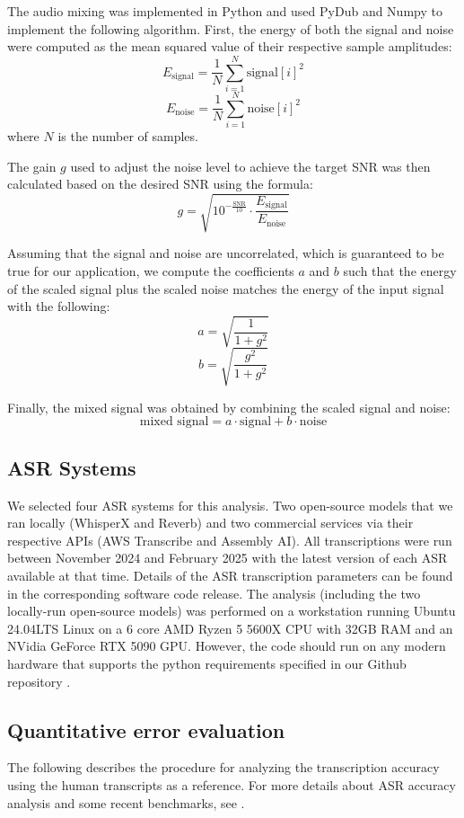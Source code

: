 \documentclass{article}
\begin{document}
The audio mixing was implemented in Python and used PyDub \cite{pydub2018} and Numpy \cite{numpyharris2020} to implement the following algorithm. First, the energy of both the signal and noise were computed as the mean squared value of their respective sample amplitudes:
   \[
   E_{\text{signal}} = \frac{1}{N} \sum_{i=1}^{N} \text{signal}[i]^2
   \]
   \[
   E_{\text{noise}} = \frac{1}{N} \sum_{i=1}^{N} \text{noise}[i]^2
   \]
   where \( N \) is the number of samples.

The gain \( g \) used to adjust the noise level to achieve the target SNR was then calculated based on the desired SNR using the formula:
   \[
   g = \sqrt{10^{-\frac{\text{SNR}}{10}} \cdot \frac{E_{\text{signal}}}{E_{\text{noise}}}}
   \]

Assuming that the signal and noise are uncorrelated, which is guaranteed to be true for our application, we compute the coefficients \( a \) and \( b \) such that the energy of the scaled signal plus the scaled noise matches the energy of the input signal with the following:
   \[
   a = \sqrt{\frac{1}{1 + g^2}}
   \]
   \[
   b = \sqrt{\frac{g^2}{1 + g^2}}
   \]

Finally, the mixed signal was obtained by combining the scaled signal and noise:
   \[
   \text{mixed signal} = a \cdot \text{signal} + b \cdot \text{noise}
   \]


\subsection{ASR Systems}
We selected four ASR systems for this analysis. Two open-source models that we ran locally (WhisperX\cite{whisperxbain2023} and Reverb\cite{reverbbhandari2024}) and two commercial services via their respective APIs (AWS Transcribe\cite{awstranscribe2024} and Assembly AI\cite{assemblyaiuniversal2024}). All transcriptions were run between November 2024 and February 2025 with the latest version of each ASR available at that time. Details of the ASR transcription parameters can be found in the corresponding software code release. The analysis (including the two locally-run open-source models) was performed on a workstation running Ubuntu 24.04LTS Linux on a 6 core AMD Ryzen 5 5600X CPU with 32GB RAM and an NVidia GeForce RTX 5090 GPU. However, the code should run on any modern hardware that supports the python requirements specified in our Github repository \cite{repo}.

\subsection{Quantitative error evaluation}
The following describes the procedure for analyzing the transcription accuracy using the human transcripts as a reference. For more details about ASR accuracy analysis and some recent benchmarks, see \cite{Kuhn_2023}.  
\end{document}
